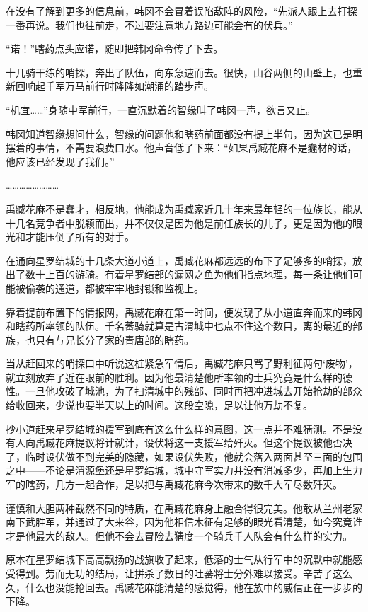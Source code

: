 在没有了解到更多的信息前，韩冈不会冒着误陷敌阵的风险，“先派人跟上去打探一番再说。我们也往前走，不过要注意地方路边可能会有的伏兵。”

“诺！”瞎药点头应诺，随即把韩冈命令传了下去。

十几骑干练的哨探，奔出了队伍，向东急速而去。很快，山谷两侧的山壁上，也重新回响起千军万马前行时隆隆如潮涌的踏步声。

“机宜……”身随中军前行，一直沉默着的智缘叫了韩冈一声，欲言又止。

韩冈知道智缘想问什么，智缘的问题他和瞎药前面都没有提上半句，因为这已是明摆着的事情，不需要浪费口水。他声音低了下来：“如果禹臧花麻不是蠢材的话，他应该已经发现了我们。”

……………………

禹臧花麻不是蠢才，相反地，他能成为禹臧家近几十年来最年轻的一位族长，能从十几名竞争者中脱颖而出，并不仅仅是因为他是前任族长的儿子，更是因为他的眼光和才能压倒了所有的对手。

在通向星罗结城的十几条大道小道上，禹臧花麻都远远的布下了足够多的哨探，放出了数十上百的游骑。有着星罗结部的漏网之鱼为他们指点地理，每一条让他们可能被偷袭的通道，都被牢牢地封锁和监视上。

靠着提前布置下的情报网，禹臧花麻在第一时间，便发现了从小道直奔而来的韩冈和瞎药所率领的队伍。千名蕃骑就算是古渭城中也点不住这个数目，离的最近的部族，也只有与兄长分了家的青唐部的瞎药。

当从赶回来的哨探口中听说这桩紧急军情后，禹臧花麻只骂了野利征两句‘废物’，就立刻放弃了近在眼前的胜利。因为他最清楚他所率领的士兵究竟是什么样的德性。一旦他攻破了城池，为了扫清城中的残部、同时再把冲进城去开始抢劫的部众给收回来，少说也要半天以上的时间。这段空隙，足以让他万劫不复。

抄小道赶来星罗结城的援军到底有这么什么样的意图，这一点并不难猜测。不是没有人向禹臧花麻提议将计就计，设伏将这一支援军给歼灭。但这个提议被他否决了，临时设伏做不到完美的隐藏，如果设伏失败，他就会落入两面甚至三面的包围之中——不论是渭源堡还是星罗结城，城中守军实力并没有消减多少，再加上生力军的瞎药，几方一起合作，足以把与禹臧花麻今次带来的数千大军尽数歼灭。

谨慎和大胆两种截然不同的特质，在禹臧花麻身上融合得很完美。他敢从兰州老家南下武胜军，并通过了大来谷，因为他相信木征有足够的眼光看清楚，如今究竟谁才是他最大的敌人。但他不会去冒险去猜度一个骑兵千人队会有什么样的实力。

原本在星罗结城下高高飘扬的战旗收了起来，低落的士气从行军中的沉默中就能感受得到。劳而无功的结局，让拼杀了数日的吐蕃将士分外难以接受。辛苦了这么久，什么也没能抢回去。禹臧花麻能清楚的感觉得，他在族中的威信正在一步步的下降。

